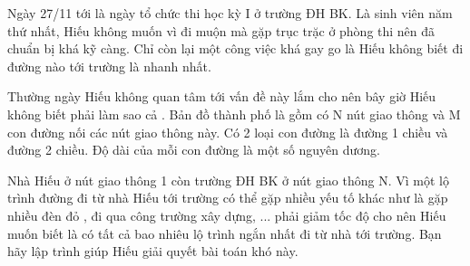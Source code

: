 Ngày 27/11 tới là ngày tổ chức thi học kỳ I ở trường ĐH BK. Là sinh viên năm thứ nhất, Hiếu không muốn vì đi muộn mà gặp trục trặc ở phòng thi nên đã chuẩn bị khá kỹ càng. Chỉ còn lại một công việc khá gay go là Hiếu không biết đi đường nào tới trường là nhanh nhất.  

   Thường ngày Hiếu không quan tâm tới vấn đề này lắm cho nên bây giờ Hiếu không biết phải làm sao cả . Bản đồ thành phố là gồm có N nút giao thông và M con đường nối các nút giao thông này. Có 2 loại con đường là đường 1 chiều và đường 2 chiều. Độ dài của mỗi con đường là một số nguyên dương.  

   Nhà Hiếu ở nút giao thông 1 còn trường ĐH BK ở nút giao thông N. Vì một lộ trình đường đi từ nhà Hiếu tới trường có thể gặp nhiều yếu tố khác như là gặp nhiều đèn đỏ , đi qua công trường xây dựng, ... phải giảm tốc độ cho nên Hiếu muốn biết là có tất cả bao nhiêu lộ trình ngắn nhất đi từ nhà tới trường. Bạn hãy lập trình giúp Hiếu giải quyết bài toán khó này.  

\